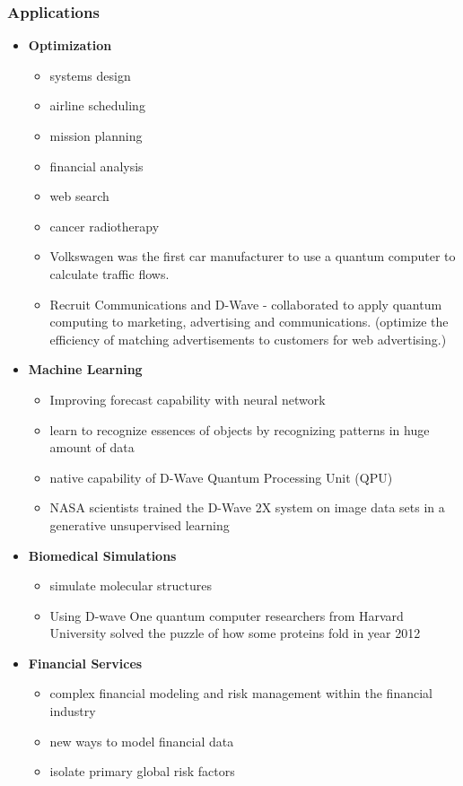 \documentclass[xcolor=x11names,table]{beamer}
\begin{document}
\begin{frame}[allowframebreaks]
\frametitle{Applications}
	\begin{itemize}
		\item \textbf{Optimization}
			\begin{itemize}
				\item systems design
				\item airline scheduling
				\item mission planning
				\item financial analysis
				\item web search
				\item cancer radiotherapy
				\item Volkswagen was the first car manufacturer to use a quantum computer to calculate traffic flows. 
				\item Recruit Communications and D-Wave - collaborated to apply quantum computing to marketing, advertising and communications. (optimize the efficiency of matching advertisements to customers for web advertising.)
			\end{itemize}
		\newpage
		
		\item \textbf{Machine Learning}
		\begin{itemize}
			\item Improving forecast capability with neural network
			\item learn to recognize essences of objects by recognizing patterns in huge amount of data
			\item native capability of D-Wave Quantum Processing Unit (QPU)
			\item NASA scientists trained the D-Wave 2X system on image data sets in a generative unsupervised learning 
		\end{itemize}
		\newpage
		
		\item \textbf{Biomedical Simulations}
			\begin{itemize}
				\item simulate molecular structures
				\item Using D-wave One quantum computer researchers from Harvard University solved the puzzle of how some proteins fold in year 2012 
			\end{itemize}
		
		\item \textbf{Financial Services}
			\begin{itemize}
				\item complex financial modeling and risk management within the financial industry
				\item new ways to model financial data
				\item isolate primary global risk factors
			\end{itemize}
	\end{itemize}
\end{frame}
\end{document}
